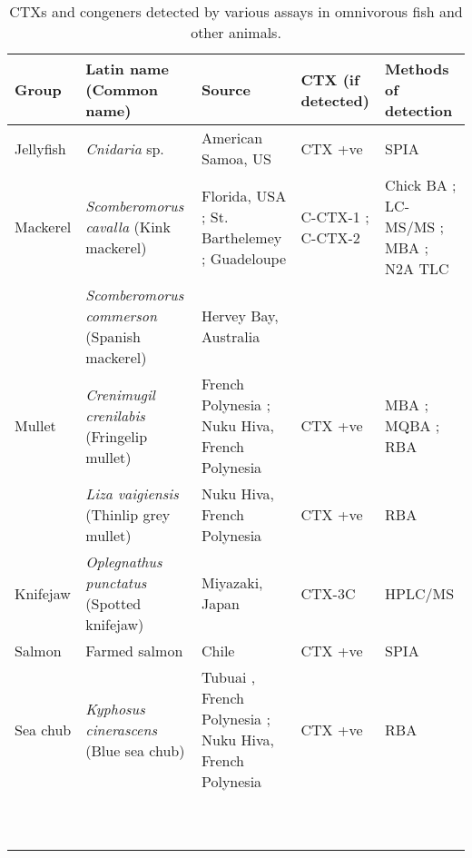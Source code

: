 \documentclass[12pt]{article}
\begin{document}
\begin{table}
\caption{CTXs and congeners detected by various assays in omnivorous fish and other animals.}
\label{tbl:OmniTable}
\begin{tabular}{ | p{2cm} | p{3cm} | p{4.5cm} | p{2cm} | p{3cm} | }
\hline
\textbf{Group} & \textbf{Latin name} (Common name) & \textbf{Source} & \textbf{CTX (if detected)} & \textbf{Methods of detection} \\
\hline 
 Jellyfish &  \emph{Cnidaria} sp. &  American Samoa, US \cite{zlotnick1995ciguatera} & CTX +ve \cite{zlotnick1995ciguatera} &  SPIA \cite{zlotnick1995ciguatera} \\
 \hline
 Mackerel & \emph{Scomberomorus cavalla} (Kink mackerel) & Florida, USA \cite{dickey2008ciguatera}; St. Barthelemey \cite{pottier2001ciguatera,vernoux1986heterogeneity};  Guadeloupe \cite{pottier2001ciguatera} & C-CTX-1 \cite{dickey2008ciguatera}; C-CTX-2 \cite{dickey2008ciguatera} & Chick BA \cite{pottier2001ciguatera}; LC-MS/MS \cite{dickey2008ciguatera}; MBA \cite{vernoux1986heterogeneity}; N2A \cite{dickey2008ciguatera} TLC \cite{vernoux1986heterogeneity} \\
  & \emph{Scomberomorus commerson} (Spanish mackerel) & Hervey Bay, Australia \cite{} &  & \\ %
 \hline
Mullet  &  \emph{Crenimugil crenilabis} (Fringelip mullet) & French Polynesia \cite{bagnis1987use}; Nuku Hiva, French Polynesia \cite{darius2007ciguatera} & CTX +ve \cite{darius2007ciguatera} & MBA \cite{bagnis1987use}; MQBA \cite{bagnis1987use}; RBA \cite{darius2007ciguatera}\\
  & \emph{Liza vaigiensis} (Thinlip grey mullet) & Nuku Hiva, French Polynesia \cite{darius2007ciguatera} & CTX +ve \cite{darius2007ciguatera} & RBA \cite{darius2007ciguatera} \\
  \hline
 Knifejaw & \emph{Oplegnathus punctatus} (Spotted knifejaw) & Miyazaki, Japan \cite{yogi2011detailed} & CTX-3C \cite{yogi2011detailed} & HPLC/MS \cite{yogi2011detailed}\\
 \hline
 Salmon &  Farmed salmon & Chile \cite{ebesu1994first} & CTX +ve \cite{ebesu1994first} & SPIA \cite{ebesu1994first}\\
 \hline
 Sea chub & \emph{Kyphosus cinerascens} (Blue sea chub)  & Tubuai , French Polynesia \cite{darius2007ciguatera}; Nuku Hiva, French Polynesia \cite{darius2007ciguatera} & CTX +ve \cite{darius2007ciguatera} & RBA \cite{darius2007ciguatera}  \\
  & \emph{} &  &  & \\
  &  \emph{} &  &  & \\
  & \emph{}  &  &  & \\
  & \emph{} &  &  & \\
  &  \emph{} &  &  & \\
  & \emph{}  &  &  & \\
  & \emph{} &  &  & \\
  &  \emph{} &  &  & \\
  & \emph{}  &  &  & \\
  & \emph{} &  &  & \\
\end{tabular}
\end{table}
\end{document}
